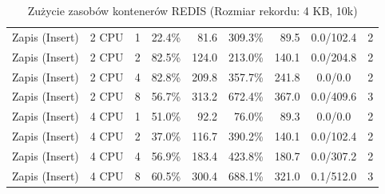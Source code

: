 \begin{table}[ht]
{\begin{tabular}{llcrrrrcc}
Zapis (Insert) & 2 CPU & 1 & 22.4\% & 81.6 & 309.3\% & 89.5 & 0.0/102.4 & 2 \\
Zapis (Insert) & 2 CPU & 2 & 82.5\% & 124.0 & 213.0\% & 140.1 & 0.0/204.8 & 2 \\
Zapis (Insert) & 2 CPU & 4 & 82.8\% & 209.8 & 357.7\% & 241.8 & 0.0/0.0 & 2 \\
Zapis (Insert) & 2 CPU & 8 & 56.7\% & 313.2 & 672.4\% & 367.0 & 0.0/409.6 & 3 \\
Zapis (Insert) & 4 CPU & 1 & 51.0\% & 92.2 & 76.0\% & 89.3 & 0.0/0.0 & 2 \\
Zapis (Insert) & 4 CPU & 2 & 37.0\% & 116.7 & 390.2\% & 140.1 & 0.0/102.4 & 2 \\
Zapis (Insert) & 4 CPU & 4 & 56.9\% & 183.4 & 423.8\% & 180.7 & 0.0/307.2 & 2 \\
Zapis (Insert) & 4 CPU & 8 & 60.5\% & 300.4 & 688.1\% & 321.0 & 0.1/512.0 & 3 \\
\bottomrule
\end{tabular}%
}
\caption{Zużycie zasobów kontenerów REDIS (Rozmiar rekordu: 4 KB, 10k)}
\label{tab:resources_redis_medium_10000}
\end{table}

